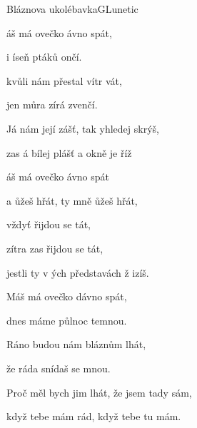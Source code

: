 \begin{song}{Bláznova ukolébavka}{G}{Lunetic}

\begin{SBVerse}

áš má ovečko ávno spát,

i íseň ptáků ončí.

kvůli nám přestal vítr vát,

jen můra zírá zvenčí.

Já nám její zášť, tak yhledej skrýš,

zas á bílej plášť a  okně je říž

\end{SBVerse}

\begin{SBChorus}

áš má ovečko ávno spát

a ůžeš hřát, ty mně ůžeš hřát,

vždyť řijdou se tát,

zítra zas řijdou se tát,

jestli ty v ých představách ž izíš.

\end{SBChorus}

\begin{SBVerse}

Máš má ovečko dávno spát,

dnes máme půlnoc temnou.

Ráno budou nám bláznům lhát,

že ráda snídaš se mnou.

Proč měl bych jim lhát, že jsem tady sám,

když tebe mám rád, když tebe tu mám.

\end{SBVerse}

\begin{SBChorus}

\end{SBChorus}

\end{song}

\clearpage
